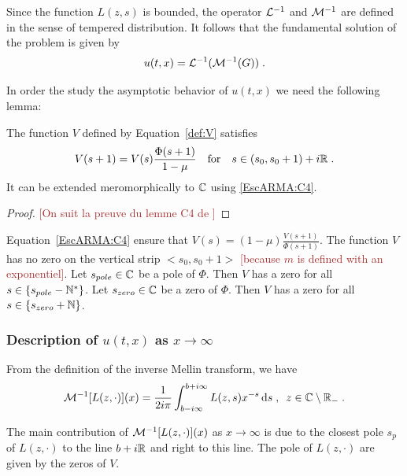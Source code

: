 \documentclass[11pt]{amsart}
\newcommand{\diff}{\,\mathrm{d}}
\newcommand{\ndr}[1]{\textcolor{brown}{[#1]}}
\begin{document}
Since the function $L(z,s)$ is bounded, the operator $\mathcal{L}^{-1}$ and $ \mathcal{M}^{-1}$ are defined in the sense of tempered distribution. It follows that the fundamental solution of the problem is given by 
    \begin{equation}
        u(t,x) = \mathcal{L}^{-1} (\mathcal{M}^{-1} (G))
        \; .
    \end{equation}
    
In order the study the asymptotic behavior of $u(t,x)$ we need the following lemma: 
\begin{lemma}The function $V$ defined by Equation~\eqref{def:V} satisfies
    \begin{equation}
        V(s+1) = V(s)\frac{\Phi(s+1)}{1-\mu}
        \quad \text{for} \quad
        s \in (s_0, s_0+1) + i\mathbb{R}
        \; .
        \label{EscARMA:C4}
    \end{equation}
It can be extended meromorphically to $\mathbb{C}$ using \eqref{EscARMA:C4}.
\end{lemma}
\begin{proof}
\ndr{On suit la preuve du lemme C4 de \cite{escobedo2007fundamental}}
\end{proof}

\begin{remark}
    Equation~\eqref{EscARMA:C4} ensure that $V(s) = (1-\mu)\frac{V(s+1)}{\Phi(s+1)}$. 
    The function $V$ has no zero on the vertical strip $<s_0, s_0+1>$ \ndr{because $m$ is defined with an exponentiel}. Let $s_{pole} \in \mathbb{C}$ be a pole of $\Phi$. Then $V$ has a zero for all $s \in \{s_{pole} - \mathbb{N}^* \}$.
    Let $s_{zero} \in \mathbb{C}$ be a zero of $\Phi$. Then $V$ has a zero for all 
    $s \in \{s_{zero} + \mathbb{N}\}$. 
\end{remark}

    
\subsubsection{Description of $u(t,x)$ as $x \to \infty$}\text{\\}

From the definition of the inverse Mellin transform, we have
\begin{equation}
    \Mcal^{-1}[L(z,\cdot)](x) = \frac{1}{2i\pi} \int_{b-i\infty}^{b+i\infty} L(z,s)x^{-s}\diff s
    \eqsepv
    z \in \CC \setminus \RR_-
    \eqfinp
\end{equation}

The main contribution of $\mathcal{M}^{-1}[L(z,\cdot)](x)$ as $x \to \infty$ is due to the closest pole $s_p$ of $L(z,\cdot)$ to the line $b+i\mathbb{R}$ and right to this line. The pole of $L(z,\cdot)$ are given by the zeros of $V$. 
\end{document}
